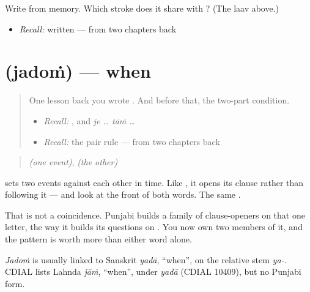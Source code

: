 \begin{tcolorbox}[breakable,colback=teal!4,colframe=teal!35!black,title={Before you move on}]
Write \textbf{} from memory. Which stroke does it share with \textbf{}? (The laav above.)

\begin{itemize}
\raggedright
  \item \emph{Recall:} \textbf{} written — from two chapters back
\end{itemize}
\end{tcolorbox}
\section[\texorpdfstring{\pa{ਜਦੋਂ} (jadoṁ)}{ਜਦੋਂ (jadoṁ)}]{ (jadoṁ) — when}

\label{lesson:PA-C41-jadon}



\begin{quote}
One lesson back you wrote \textbf{}. And before that, the two-part condition.

\begin{itemize}
\raggedright
  \item \emph{Recall:} \textbf{}, and \emph{je … tāṁ …}
  \item \emph{Recall:} the pair rule — from two chapters back
\end{itemize}
\end{quote}

\begin{cousinweb}
\begin{quote}
\textbf{} \emph{(one event)}, \emph{(the other)}
\end{quote}

\textbf{} sets two events against each other in time. Like \textbf{}, it opens its clause rather than following it — and look at the front of both words. The same \textbf{}.

That is not a coincidence. Punjabi builds a family of clause-openers on that one letter, the way it builds its questions on \textbf{}. You now own two members of it, and the pattern is worth more than either word alone.

\emph{Jadoṁ} is usually linked to Sanskrit \emph{yadā}, \textquotedblleft{}when\textquotedblright{}, on the relative stem \emph{ya-}. CDIAL lists Lahnda \emph{jāṁ}, \textquotedblleft{}when\textquotedblright{}, under \emph{yadā} (CDIAL 10409), but no Punjabi form.
\end{cousinweb}

